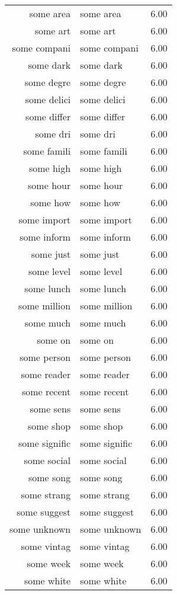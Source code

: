 \begin{table}[ht]
\begin{tabular}{rlr}
  some area & some area & 6.00 \\ 
  some art & some art & 6.00 \\ 
  some compani & some compani & 6.00 \\ 
  some dark & some dark & 6.00 \\ 
  some degre & some degre & 6.00 \\ 
  some delici & some delici & 6.00 \\ 
  some differ & some differ & 6.00 \\ 
  some dri & some dri & 6.00 \\ 
  some famili & some famili & 6.00 \\ 
  some high & some high & 6.00 \\ 
  some hour & some hour & 6.00 \\ 
  some how & some how & 6.00 \\ 
  some import & some import & 6.00 \\ 
  some inform & some inform & 6.00 \\ 
  some just & some just & 6.00 \\ 
  some level & some level & 6.00 \\ 
  some lunch & some lunch & 6.00 \\ 
  some million & some million & 6.00 \\ 
  some much & some much & 6.00 \\ 
  some on & some on & 6.00 \\ 
  some person & some person & 6.00 \\ 
  some reader & some reader & 6.00 \\ 
  some recent & some recent & 6.00 \\ 
  some sens & some sens & 6.00 \\ 
  some shop & some shop & 6.00 \\ 
  some signific & some signific & 6.00 \\ 
  some social & some social & 6.00 \\ 
  some song & some song & 6.00 \\ 
  some strang & some strang & 6.00 \\ 
  some suggest & some suggest & 6.00 \\ 
  some unknown & some unknown & 6.00 \\ 
  some vintag & some vintag & 6.00 \\ 
  some week & some week & 6.00 \\ 
  some white & some white & 6.00 \\ 

\end{tabular}
\end{table}
